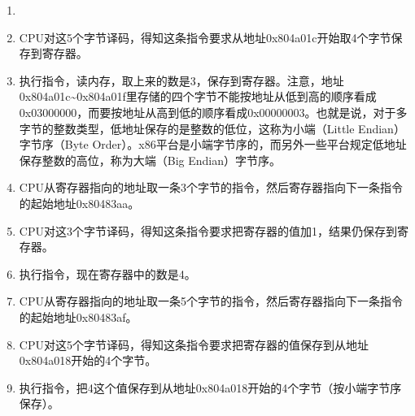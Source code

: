\begin{enumerate}

\item {}

\item CPU对这5个字节译码，得知这条指令要求从地址0x804a01c开始取4个字节保存到寄存器。

\item 执行指令，读内存，取上来的数是3，保存到寄存器。注意，地址0x804a01c\textasciitilde{}\BookSplit{}0x804a01f里存储的四个字节不能按地址从低到高的顺序看成0x03000000，而要按地址从高到低的顺序看成0x00000003。也就是说，对于多字节的整数类型，低地址保存的是整数的低位，这称为小端（Little Endian）字节序（Byte Order）。x86平台是小端字节序的，而另外一些平台规定低地址保存整数的高位，称为大端（Big Endian）字节序。

\item CPU从寄存器指向的地址取一条3个字节的指令，然后寄存器指向下一条指令的起始地址0x80483aa。

\item CPU对这3个字节译码，得知这条指令要求把寄存器的值加1，结果仍保存到寄存器。

\item 执行指令，现在寄存器中的数是4。

\item CPU从寄存器指向的地址取一条5个字节的指令，然后寄存器指向下一条指令的起始地址0x80483af。

\item CPU对这5个字节译码，得知这条指令要求把寄存器的值保存到从地址0x804a018开始的4个字节。

\item 执行指令，把4这个值保存到从地址0x804a018开始的4个字节（按小端字节序保存）。
\end{enumerate}




